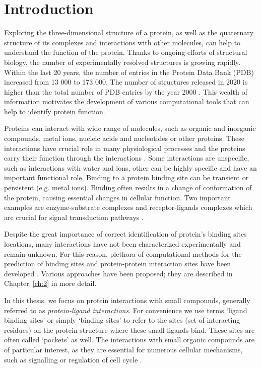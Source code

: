 
\chapter{Introduction}

Exploring the three-dimensional structure of a protein, as well as the quaternary structure of its complexes and interactions with other molecules, can help to understand the function of the protein. Thanks to ongoing efforts of structural biology, the number of experimentally resolved structures is growing rapidly. Within the last 20 years, the number of entries in the Protein Data Bank (PDB) \cite{pdb} increased from 13 000 to 173 000. The number of structures released in 2020 is higher than the total number of PDB entries by the year 2000 \cite{pdb_growth}. This wealth of information motivates the development of various computational tools that can help to identify protein function.

Proteins can interact with wide range of molecules, such as organic and inorganic compounds, metal ions, nucleic acids and nucleotides or other proteins. These interactions have crucial role in many physiological processes and the proteins carry their function through the interactions \cite{benchmark}. Some interactions are unspecific, such as interactions with water and ions, other can be highly specific and have an important functional role. Binding to a protein binding site can be transient or persistent (e.g. metal ions). Binding often results in a change of conformation of the protein, causing essential changes in cellular function. Two important examples are enzyme-substrate complexes and receptor-ligands complexes which are crucial for signal transduction pathways \cite{casp9}.

Despite the great importance of correct identification of protein's binding sites locations, many interactions have not been characterized experimentally and remain unknown. For this reason, plethora of computational methods for the prediction of binding sites and protein-protein interaction sites have been developed \cite{casp9}. Various approaches have been proposed; they are described in Chapter~\ref{ch:2} in more detail.

In this thesis, we focus on protein interactions with small compounds, generally referred to as \textit{protein-ligand interactions}. For convenience we use terms `ligand binding sites' or simply `binding sites' to refer to the sites (set of interacting residues) on the protein structure where these small ligands bind. These sites are often called `pockets' as well. The interactions with small organic compounds are of particular interest, as they are essential for numerous cellular mechanisms, such as signalling or regulation of cell cycle \cite{benchmark}.

